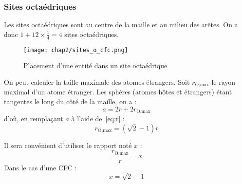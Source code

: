 \subsubsection{Sites octaédriques}
Les sites octaédriques sont au centre de la maille et au milieu
des arêtes. On a donc $1 + 12 \times \frac{1}{4} = 4$ sites octaédriques.
\begin{figure}
    \centering
    \texttt{[image: chap2/sites\_o\_cfc.png]}
    \caption{Placement d'une entité dans un site octaédrique}\label{fig:site_o_cfc}
\end{figure}
On peut calculer la taille maximale des atomes étrangers.
Soit $r_{\text{O,max}}$ le rayon maximal d'un atome étranger.
Les sphères (atomes h\^otes et étrangers) étant tangentes le
long du c\^oté de la maille, on a :
\begin{equation}
    a = 2r + 2r_{\text{O,max}}
\end{equation}
d'où, en remplaçant $a$ à l'aide de~\ref{eq:r} :
\begin{equation}
    \boxed{r_{\text{O,max}} = (\sqrt{2} - 1)r} \label{eq:rmax}
\end{equation}
\begin{rem}
    Il sera convénient d'utiliser le rapport noté $x$ :
    \begin{equation*}
        \frac{r_{\text{O,max}}}{r} = x
    \end{equation*}
    Dans le cas d'une CFC :
    \begin{equation*}
        x = \sqrt{2} - 1
    \end{equation*}
\end{rem}

